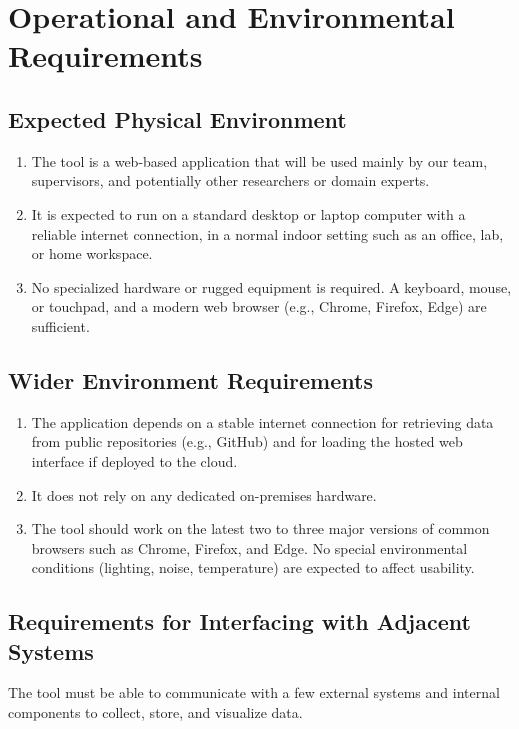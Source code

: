 \documentclass[12pt]{article}
\begin{document}
\section{Operational and Environmental Requirements}
\subsection{Expected Physical Environment}

\begin{enumerate}[label=OE-EPE\arabic*]
\item The tool is a web-based application that will be used mainly by our team, supervisors, and potentially other researchers or domain experts.
\item It is expected to run on a standard desktop or laptop computer with a reliable internet connection, in a normal indoor setting such as an office, lab, or home workspace.
\item No specialized hardware or rugged equipment is required. A keyboard, mouse, or touchpad, and a modern web browser (e.g., Chrome, Firefox, Edge) are sufficient.
\end{enumerate}

\subsection{Wider Environment Requirements}
\begin{enumerate}[label=OE-WE\arabic*]
\item The application depends on a stable internet connection for retrieving data from public repositories (e.g., GitHub) and for loading the hosted web interface if deployed to the cloud.
\item It does not rely on any dedicated on-premises hardware.
\item The tool should work on the latest two to three major versions of common browsers such as Chrome, Firefox, and Edge. No special environmental conditions (lighting, noise, temperature) are expected to affect usability.
\end{enumerate}
\subsection{Requirements for Interfacing with Adjacent Systems}
The tool must be able to communicate with a few external systems and internal components to collect, store, and visualize data.
\end{document}
